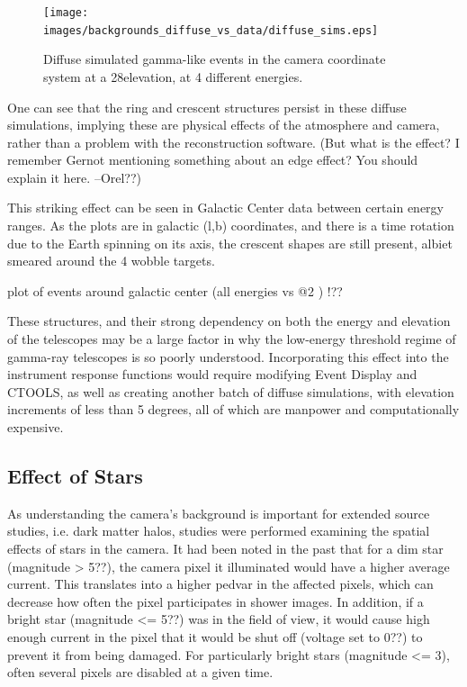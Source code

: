     \begin{figure}[ht]
      \centering
      \texttt{[image: images/backgrounds\_diffuse\_vs\_data/diffuse\_sims.eps]}
      \caption[Diffuse Simulated Backgrounds]{
        Diffuse simulated gamma-like events in the camera coordinate system at a 28\degree elevation, at 4 different energies.
      }
      \label{fig:back_simdiffuse}
    \end{figure}

    One can see that the ring and crescent structures persist in these diffuse simulations, implying these are physical effects of the atmosphere and camera, rather than a problem with the reconstruction software.
    (But what is the effect? I remember Gernot mentioning something about an edge effect? You should explain it here. --Orel??)

    This striking effect can be seen in Galactic Center data between certain energy ranges.
    As the plots are in galactic (l,b) coordinates, and there is a time rotation due to the Earth spinning on its axis, the crescent shapes are still present, albiet smeared around the 4 wobble targets.

    plot of events around galactic center (all energies vs @2 \TeV ) !??
    
    These structures, and their strong dependency on both the energy and elevation of the telescopes may be a large factor in why the low-energy threshold regime of gamma-ray telescopes is so poorly understood.
    Incorporating this effect into the instrument response functions would require modifying Event Display and CTOOLS, as well as creating another batch of diffuse simulations, with elevation increments of less than 5 degrees, all of which are manpower and computationally expensive.
    
    

  \subsection{Effect of Stars}
    As understanding the camera's background is important for extended source studies, i.e. dark matter halos, studies were performed examining the spatial effects of stars in the camera.
    It had been noted in the past that for a dim star (magnitude > 5??), the camera pixel it illuminated would have a higher average current.
    This translates into a higher pedvar in the affected pixels, which can decrease how often the pixel participates in shower images.
    In addition, if a bright star (magnitude <= 5??) was in the field of view, it would cause high enough current in the pixel that it would be shut off (voltage set to 0??) to prevent it from being damaged.
    For particularly bright stars (magnitude <= 3), often several pixels are disabled at a given time.

